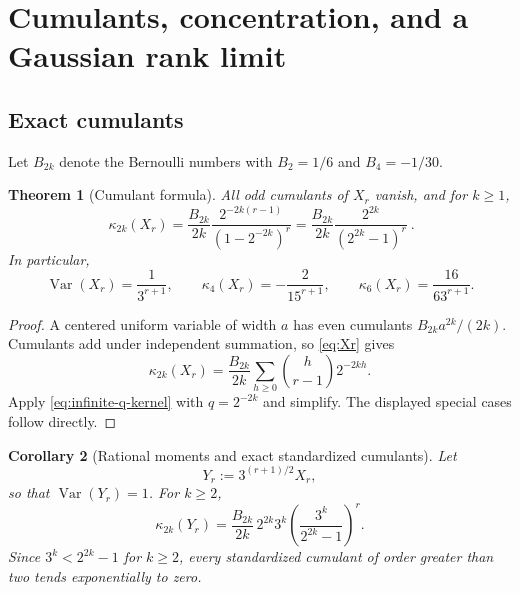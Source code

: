 \documentclass[11pt,a4paper]{article}
\theoremstyle{frontier}
\newtheorem{theorem}{Theorem}[section]
\newtheorem{corollary}[theorem]{Corollary}
\theoremstyle{definition}
\newcommand{\Var}{\operatorname{Var}}
\begin{document}
\section{Cumulants, concentration, and a Gaussian rank limit}\label{sec:gaussian}

\subsection{Exact cumulants}

Let $B_{2k}$ denote the Bernoulli numbers with $B_2=1/6$ and $B_4=-1/30$.

\begin{theorem}[Cumulant formula]\label{thm:cumulants}
All odd cumulants of $X_r$ vanish, and for $k\ge1$,
\begin{equation}\label{eq:cumulant-r}
 \boxed{\ 
 \kappa_{2k}(X_r)
 =\frac{B_{2k}}{2k}
  \frac{2^{-2k(r-1)}}{(1-2^{-2k})^r}
 =\frac{B_{2k}}{2k}\frac{2^{2k}}{(2^{2k}-1)^r}
 \ }.
\end{equation}
In particular,
\begin{equation}\label{eq:first-cumulants}
 \Var(X_r)=\frac1{3^{r+1}},
 \qquad
 \kappa_4(X_r)=-\frac2{15^{r+1}},
 \qquad
 \kappa_6(X_r)=\frac{16}{63^{r+1}}.
\end{equation}
\end{theorem}

\begin{proof}
A centered uniform variable of width $a$ has even cumulants
$B_{2k}a^{2k}/(2k)$.  Cumulants add under independent summation, so \eqref{eq:Xr} gives
\[
 \kappa_{2k}(X_r)
 =\frac{B_{2k}}{2k}
  \sum_{h\ge0}\binom h{r-1}2^{-2kh}.
\]
Apply \eqref{eq:infinite-q-kernel} with $q=2^{-2k}$ and simplify.  The displayed special cases follow directly.
\end{proof}

\begin{corollary}[Rational moments and exact standardized cumulants]\label{cor:standard-cumulants}
Let
\begin{equation}\label{eq:Yr}
  Y_r:=3^{(r+1)/2}X_r,
\end{equation}
so that $\Var(Y_r)=1$.  For $k\ge2$,
\begin{equation}\label{eq:standard-cumulants}
 \kappa_{2k}(Y_r)
 =\frac{B_{2k}}{2k}\,2^{2k}3^k
  \left(\frac{3^k}{2^{2k}-1}\right)^r.
\end{equation}
Since $3^k<2^{2k}-1$ for $k\ge2$, every standardized cumulant of order greater than two tends exponentially to zero.
\end{corollary}
\end{document}
